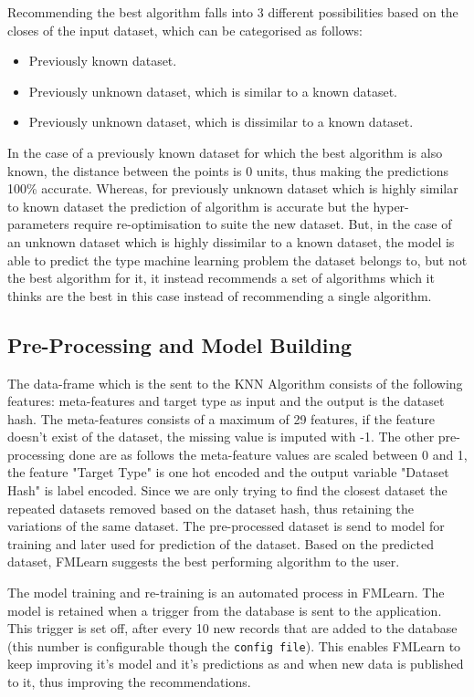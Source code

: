 Recommending the best algorithm falls into 3 different possibilities based on the closes of the input dataset, which can be categorised as follows:
\begin{itemize}
    \item Previously known dataset.
    \item Previously unknown dataset, which is similar to a known dataset.
    \item Previously unknown dataset, which is dissimilar to a known dataset.
\end{itemize}

 In the case of a previously known dataset for which the best algorithm is also known, the distance between the points is 0 units, thus making the predictions 100\% accurate. Whereas, for previously unknown dataset which is highly similar to known dataset the prediction of algorithm is accurate but the hyper-parameters require re-optimisation to suite the new dataset. But, in the case of an unknown dataset which is highly dissimilar to a known dataset, the model is able to predict the type machine learning problem the dataset belongs to, but not the best algorithm for it, it instead recommends a set of algorithms which it thinks are the best in this case instead of recommending a single algorithm.
   

\subsection{Pre-Processing and Model Building}
\label{model-building}

The data-frame which is the sent to the KNN Algorithm consists of the following features: meta-features and target type as input and the output is the dataset hash. The meta-features consists of a maximum of 29 features, if the feature doesn't exist of the dataset, the missing value is imputed with -1. The other pre-processing done are as follows the meta-feature values are scaled between 0 and 1, the feature "Target Type" is one hot encoded and the output variable "Dataset Hash" is label encoded. Since we are only trying to find the closest dataset the repeated datasets removed based on the dataset hash, thus retaining the variations of the same dataset. The pre-processed dataset is send to model for training and later used for prediction of the dataset. Based on the predicted dataset, FMLearn suggests the best performing algorithm to the user.

The model training and re-training is an automated process in FMLearn. The model is retained when a trigger from the database is sent to the application. This trigger is set off, after every 10 new records that are added to the database (this number is configurable though the \texttt{config file}). This enables FMLearn to keep improving it's model and it's predictions as and when new data is published to it, thus improving the recommendations.

